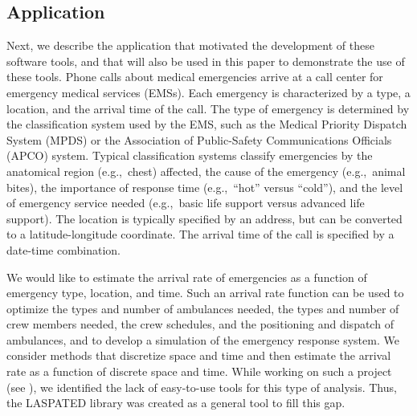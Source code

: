 \documentclass[article]{jss}
\newcommand{\ignore}[1]{}
\begin{document}
\subsection{Application}


\ignore{
Developing tools and models for discrete stochastic data is paramount for many decision-making problems under uncertainty with discrete data.
Since such models are often time and space dependent, time and space discretization tools are useful for the analysis of discrete spatiotemporal data.
For instance, the allocation of ambulances of an emergency health service of a large city to emergency calls depends on the dynamics of the process of emergency calls for the city, which is time and space dependent.
}

Next, we describe the application that motivated the development of these software tools, and that will also be used in this paper to demonstrate the use of these tools.
Phone calls about medical emergencies arrive at a call center for emergency medical services (EMSs).
Each emergency is characterized by a type, a location, and the arrival time of the call.
The type of emergency is determined by the classification system used by the EMS, such as the Medical Priority Dispatch System (MPDS) or the Association of Public-Safety Communications Officials (APCO) system.
Typical classification systems classify emergencies by the anatomical region (e.g.,\ chest) affected, the cause of the emergency (e.g.,\ animal bites), the importance of response time (e.g.,\ ``hot'' versus ``cold''), and the level of emergency service needed (e.g.,\ basic life support versus advanced life support).
The location is typically specified by an address, but can be converted to a latitude-longitude coordinate.
The arrival time of the call is specified by a date-time combination.

We would like to estimate the arrival rate of emergencies as a function of emergency type, location, and time.
Such an arrival rate function can be used to optimize the types and number of ambulances needed, the types and number of crew members needed, the crew schedules, and the positioning and dispatch of ambulances, and to develop a simulation of the emergency response system.
We consider methods that discretize space and time and then estimate the arrival rate as a function of discrete space and time.
While working on such a project (see \cite{guiklevhn2022}), we identified the lack of easy-to-use tools for this type of analysis.
Thus, the LASPATED library was created as a general tool to fill this gap.
\end{document}
